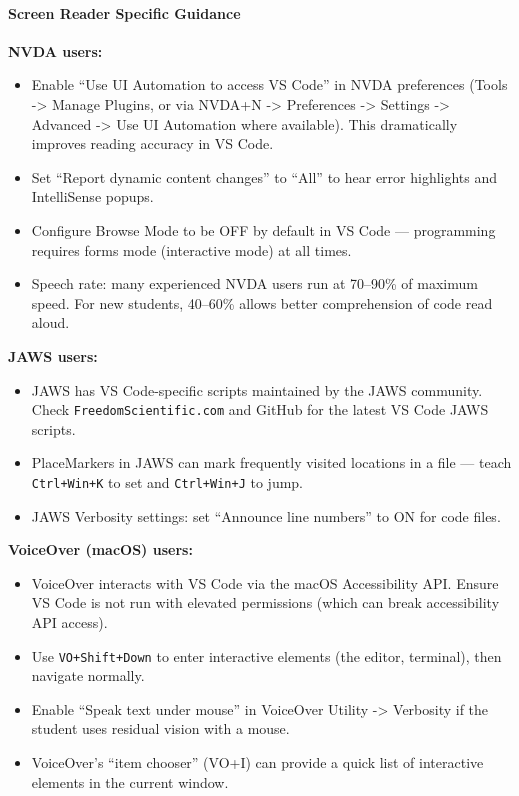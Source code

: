 \documentclass[
  justified,
  openright,
]{tufte-book}
\let\paragraph\paragraph
\let\paragraph\paragraph
\providecommand{\tightlist}{%
  \setlength{\itemsep}{0pt}\setlength{\parskip}{0pt}}
\begin{document}
\paragraph{Screen Reader Specific
Guidance}\label{screen-reader-specific-guidance}

\textbf{NVDA users:}

\begin{itemize}
\tightlist
\item
  Enable ``Use UI Automation to access VS Code'' in NVDA preferences
  (Tools -\textgreater{} Manage Plugins, or via NVDA+N -\textgreater{}
  Preferences -\textgreater{} Settings -\textgreater{} Advanced
  -\textgreater{} Use UI Automation where available). This dramatically
  improves reading accuracy in VS Code.
\item
  Set ``Report dynamic content changes'' to ``All'' to hear error
  highlights and IntelliSense popups.
\item
  Configure Browse Mode to be OFF by default in VS Code --- programming
  requires forms mode (interactive mode) at all times.
\item
  Speech rate: many experienced NVDA users run at 70--90\% of maximum
  speed. For new students, 40--60\% allows better comprehension of code
  read aloud.
\end{itemize}

\textbf{JAWS users:}

\begin{itemize}
\tightlist
\item
  JAWS has VS Code-specific scripts maintained by the JAWS community.
  Check \texttt{FreedomScientific.com} and GitHub for the latest VS Code
  JAWS scripts.
\item
  PlaceMarkers in JAWS can mark frequently visited locations in a file
  --- teach \texttt{Ctrl+Win+K} to set and \texttt{Ctrl+Win+J} to jump.
\item
  JAWS Verbosity settings: set ``Announce line numbers'' to ON for code
  files.
\end{itemize}

\textbf{VoiceOver (macOS) users:}

\begin{itemize}
\tightlist
\item
  VoiceOver interacts with VS Code via the macOS Accessibility API.
  Ensure VS Code is not run with elevated permissions (which can break
  accessibility API access).
\item
  Use \texttt{VO+Shift+Down} to enter interactive elements (the editor,
  terminal), then navigate normally.
\item
  Enable ``Speak text under mouse'' in VoiceOver Utility -\textgreater{}
  Verbosity if the student uses residual vision with a mouse.
\item
  VoiceOver's ``item chooser'' (VO+I) can provide a quick list of
  interactive elements in the current window.
\end{itemize}
\end{document}
